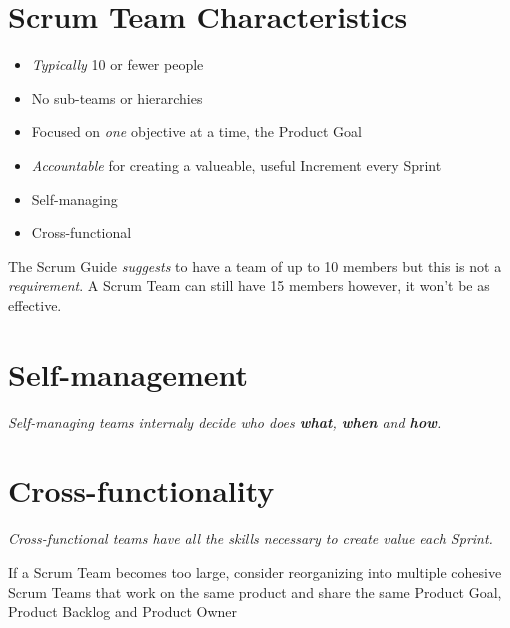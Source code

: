 \documentclass[a4paper,11pt,twocolumn]{article}
\begin{document}
\section*{Scrum Team Characteristics}
\begin{itemize}
	\item \textit{Typically} 10 or fewer people
	\item No sub-teams or hierarchies
	\item Focused on \textit{one} objective at a time, the Product Goal
	\item \textit{Accountable} for creating a valueable, useful Increment every Sprint
	\item Self-managing
	\item Cross-functional
\end{itemize}

\begin{tcolorbox}[colback=black!8!white,colframe=gray!50!black,title=Note,sharp corners,fonttitle=\normalsize\bfseries,fontupper=\normalsize,left=0.7em,right=0.7em]
	The Scrum Guide \textit{suggests} to have a team of up to 10 members but this is not a \textit{requirement}. A Scrum Team can still have 15 members however, it won't be as effective.
\end{tcolorbox}

\section*{Self-management}
\textit{Self-managing teams internaly decide who does \textbf{what}, \textbf{when} and \textbf{how}.}

\section*{Cross-functionality}
\textit{Cross-functional teams have all the skills necessary to create value each Sprint.}

\hspace{0.5pt}

\begin{tcolorbox}[colback=black!8!white,colframe=gray!50!black,title=Note,sharp corners,fonttitle=\normalsize\bfseries,fontupper=\normalsize,left=0.7em,right=0.7em]
	If a Scrum Team becomes too large, consider reorganizing into multiple cohesive Scrum Teams that work on the same product and share the same Product Goal, Product Backlog and Product Owner
\end{tcolorbox}
\end{document}
